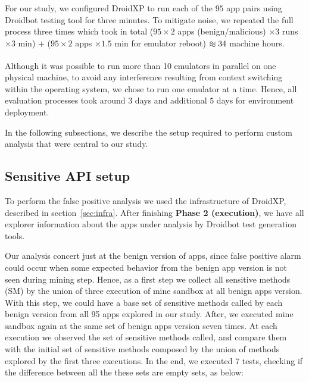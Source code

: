 For our study, we configured DroidXP to run each of the $95$  app pairs using Droidbot testing tool for three minutes. To mitigate noise, we repeated the full process three times which took in total ($95 \times 2$ apps (benign/malicious) $\times 3$ runs $\times 3$ min) + ($95 \times 2$ apps $\times 1.5$ min for emulator reboot) $\apeq 34$ machine hours.

Although it was possible to run more than 10 emulators in parallel on one physical machine, to avoid any interference resulting from context switching within the operating system, we chose to run one emulator at a time. Hence, all evaluation processes took around $3$ days and additional $5$ days for environment deployment.

In the following subsections, we describe the setup required to perform custom analysis that were central to our study.

\subsection{Sensitive API setup} \label{sec:sensitivapi}
To perform the false positive analysis we used the infrastructure of DroidXP, described in section~\ref{sec:infra}. After finishing \textbf{Phase 2 (execution)}, we have all explorer information about the apps under analysis by Droidbot test generation tools.

Our analysis concert just at the benign version of apps, since false positive alarm could occur when some expected behavior from the benign app version is not seen during mining step. Hence, as a first step we collect all sensitive methods (SM) by the union of three execution of mine sandbox at all benign apps version. With this step, we could have a base set of sensitive methods called by each benign version from all 95 apps explored in our study. After, we executed mine sandbox again at the same set of benign apps version seven times. At each execution we observed the set of sensitive methods called, and compare them with the initial set of sensitive methods composed by the union of methods explored by the first three executions. In the end, we executed 7 tests, checking if the difference between all the these sets are empty sets, as below:\newline


